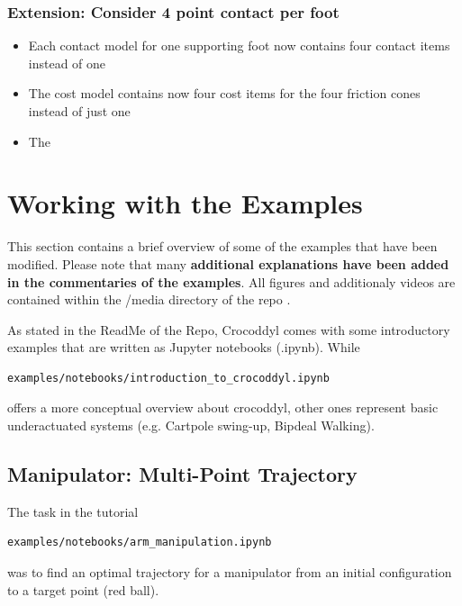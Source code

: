 \subsubsection{Extension: Consider 4 point contact per foot}
\begin{itemize}
\item Each contact model for one supporting foot now contains four contact items instead of one
\item The cost model contains now four cost items for the four friction cones instead of just one

\item The 
\end{itemize}



\section{Working with the Examples}
This section contains a brief overview of some of the examples that have been modified. Please note that many \textbf{additional explanations have been added in the commentaries of the examples}. All figures and additionaly videos are contained within the /media directory of the repo \cite{julesserOCFrameworks}. 

As stated in the ReadMe of the Repo, Crocoddyl comes with some introductory examples that are written as Jupyter notebooks (.ipynb). While 
\begin{verbatim}
examples/notebooks/introduction_to_crocoddyl.ipynb
\end{verbatim}
offers a more conceptual overview about crocoddyl, other ones represent basic underactuated systems (e.g. Cartpole swing-up, Bipdeal Walking).

\subsection{Manipulator: Multi-Point Trajectory}
The task in the tutorial
\begin{verbatim}
examples/notebooks/arm_manipulation.ipynb
\end{verbatim}
was to find an optimal trajectory for a manipulator from an initial configuration to a target point (red ball). 
